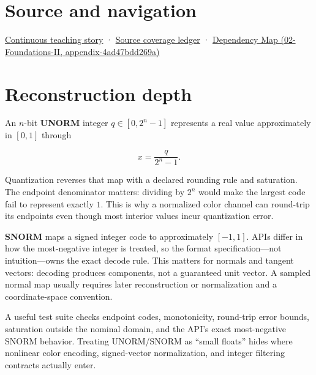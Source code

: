 \section{Source and navigation}\label{appendix-b2402c453dac-source-and-navigation}

\href{Continuous\%20Notes/Computing\%20Foundations\%20-\%20From\%20Bits\%20to\%20C++\%20and\%20Systems\%20APIs\#Choosing\%20what\%20information\%20to\%20keep}{Continuous teaching story} · \hyperref[appendix-fd090d982a15]{Source coverage ledger} · \href{../02-Foundations-II/main.pdf\#nameddest=appendix-4ad47bdd269a}{Dependency Map (02-Foundations-II, appendix-4ad47bdd269a)}

\section{Reconstruction depth}\label{appendix-b2402c453dac-reconstruction-depth}

An \(n\)-bit \textbf{UNORM} integer \(q\in[0,2^n-1]\) represents a real value approximately in \([0,1]\) through

\[
x = \frac{q}{2^n-1}.
\]

Quantization reverses that map with a declared rounding rule and saturation. The endpoint denominator matters: dividing by \(2^n\) would make the largest code fail to represent exactly \(1\). This is why a normalized color channel can round-trip its endpoints even though most interior values incur quantization error.

\textbf{SNORM} maps a signed integer code to approximately \([-1,1]\). APIs differ in how the most-negative integer is treated, so the format specification---not intuition---owns the exact decode rule. This matters for normals and tangent vectors: decoding produces components, not a guaranteed unit vector. A sampled normal map usually requires later reconstruction or normalization and a coordinate-space convention.

A useful test suite checks endpoint codes, monotonicity, round-trip error bounds, saturation outside the nominal domain, and the API's exact most-negative SNORM behavior. Treating UNORM/SNORM as ``small floats'' hides where nonlinear color encoding, signed-vector normalization, and integer filtering contracts actually enter.
